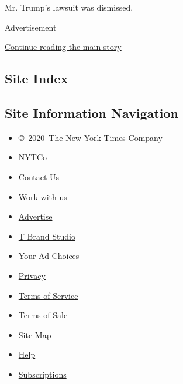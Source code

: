 Mr. Trump's lawsuit was dismissed.

Advertisement

\protect\hyperlink{after-bottom}{Continue reading the main story}

\hypertarget{site-index}{%
\subsection{Site Index}\label{site-index}}

\hypertarget{site-information-navigation}{%
\subsection{Site Information
Navigation}\label{site-information-navigation}}

\begin{itemize}
\tightlist
\item
  \href{https://help.nytimes3xbfgragh.onion/hc/en-us/articles/115014792127-Copyright-notice}{©~2020~The
  New York Times Company}
\end{itemize}

\begin{itemize}
\tightlist
\item
  \href{https://www.nytco.com/}{NYTCo}
\item
  \href{https://help.nytimes3xbfgragh.onion/hc/en-us/articles/115015385887-Contact-Us}{Contact
  Us}
\item
  \href{https://www.nytco.com/careers/}{Work with us}
\item
  \href{https://nytmediakit.com/}{Advertise}
\item
  \href{http://www.tbrandstudio.com/}{T Brand Studio}
\item
  \href{https://www.nytimes3xbfgragh.onion/privacy/cookie-policy\#how-do-i-manage-trackers}{Your
  Ad Choices}
\item
  \href{https://www.nytimes3xbfgragh.onion/privacy}{Privacy}
\item
  \href{https://help.nytimes3xbfgragh.onion/hc/en-us/articles/115014893428-Terms-of-service}{Terms
  of Service}
\item
  \href{https://help.nytimes3xbfgragh.onion/hc/en-us/articles/115014893968-Terms-of-sale}{Terms
  of Sale}
\item
  \href{https://spiderbites.nytimes3xbfgragh.onion}{Site Map}
\item
  \href{https://help.nytimes3xbfgragh.onion/hc/en-us}{Help}
\item
  \href{https://www.nytimes3xbfgragh.onion/subscription?campaignId=37WXW}{Subscriptions}
\end{itemize}
